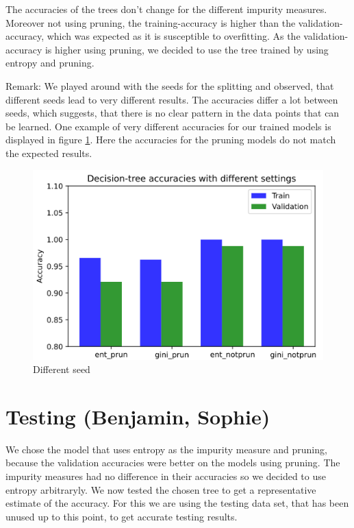 \documentclass[12pt,a4paper]{scrartcl}		%
\begin{document}
The accuracies of the trees don’t change for the different impurity measures. Moreover not using pruning, 
the training-accuracy is higher than the validation-accuracy, which was expected as it is susceptible to 
overfitting. As the validation-accuracy is higher using pruning, we decided to use the tree trained by using 
entropy and pruning.

Remark:
We played around with the seeds for the splitting and observed, that different seeds lead to very different results. 
The accuracies differ a lot between seeds, which suggests, that there is no clear pattern in the data points that 
can be learned. 
One example of very different accuracies for our trained models is displayed in figure \ref{fig:difacc}.
Here the accuracies for the pruning models do not match the expected results. 

\begin{figure}[h]
    \centering
    \includegraphics[scale = 0.8]{badresults.png}
    \caption{Different seed}
    \label{fig:difacc}
\end{figure}

\section{Testing (Benjamin, Sophie)}
We chose the model that uses entropy as the impurity measure and pruning, because the validation accuracies were 
better on the models using pruning. The impurity measures had no difference in their accuracies so we decided 
to use entropy arbitraryly. 
We now tested the chosen tree to get a representative estimate of the accuracy. 
For this we are using the testing data set, that has been unused up to this point, to get accurate testing results.
\end{document}

